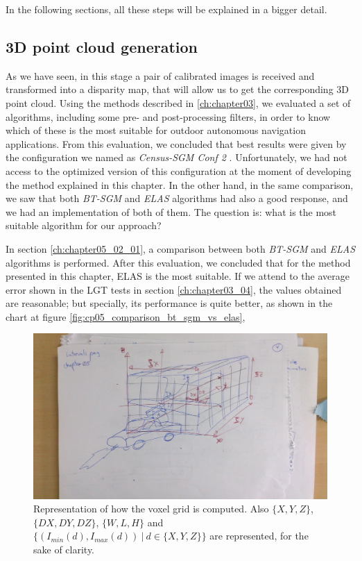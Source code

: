 In the following sections, all these steps will be explained in a bigger detail.

\subsection{3D point cloud generation}\label{ch:chapter05_01_01}

As we have seen, in this stage a pair of calibrated images is received and transformed into a disparity map, that will allow us to get the corresponding 3D point cloud. Using the methods described in \ref{ch:chapter03}, we evaluated a set of algorithms, including some pre- and post-processing filters, in order to know which of these is the most suitable for outdoor autonomous navigation applications. From this evaluation, we concluded that best results were given by the configuration we named as \emph{Census-SGM Conf 2} \citep{Hirschmuller2005}. Unfortunately, we had not access to the optimized version of this configuration at the moment of developing the method explained in this chapter. In the other hand, in the same comparison, we saw that both \emph{BT-SGM} and \emph{ELAS} algorithms had also a good response, and we had an implementation of both of them. The question is: what is the most suitable algorithm for our approach? 

In section \ref{ch:chapter05_02_01}, a comparison between both \emph{BT-SGM} and \emph{ELAS} algorithms is performed. After this evaluation, we concluded that for the method presented in this chapter, ELAS is the most suitable. If we attend to the average error shown in the \ac{LGT} tests in section \ref{ch:chapter03_04}, the values obtained are reasonable; but specially, its performance is quite better, as shown in the chart at figure \ref{fig:cp05_comparison_bt_sgm_vs_elas}, 

\begin{figure}[h!]
        \centering
        \includegraphics[width=\textwidth]{intervals}
        \caption{Representation of how the voxel grid is computed. Also $\{X, Y, Z\}$, $\{DX, DY, DZ\}$, $\{W, L, H\}$ and $\{(I_{min}(d), I_{max}(d)) ~|~ d \in \{X, Y, Z\}\}$ are represented, for the sake of clarity.}\label{fig:cp05_intervals}
\end{figure}

